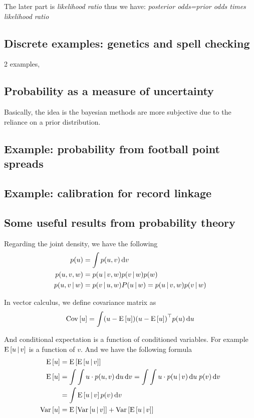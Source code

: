 \documentclass[11pt,a4paper]{article}
\begin{document}
The later part is \emph{likelihood ratio} thus we have: \emph{posterior odds=prior odds times likelihood ratio}

\subsection{Discrete examples: genetics and spell checking}

2 examples,
\subsection{Probability as a measure of uncertainty}

Basically, the idea is the bayesian methods are more subjective due to the reliance on a prior distribution.
\subsection{Example: probability from football point spreads}
\subsection{Example: calibration for record linkage}
\subsection{Some useful results from probability theory}

Regarding the joint density, we have the following
\begin{align*}
    p(u)&=\int p(u,v)\,\mathrm{d} v\\
    p(u,v,w)&=p(u\,|\, v,w)p(v\,|\, w)p(w)\\
    p(u,v\,|\, w)&=p(v\,|\, u,w)P(u\,|\, w)=p(u\,|\, v,w)p(v\,|\, w)
\end{align*}

In vector calculus, we define covariance matrix as
\[\mathrm{Cov}\left[ u \right]=\int(u-\mathrm{E}\left[ u \right]){(u-\mathrm{E}\left[ u \right])}^\top p(u)\,\mathrm{d} u\]

And conditional expectation is a function of conditioned variables. For example \(\mathrm{E}\left[ u\,|\, v \right]\) is a function of \(v\). And we have the following formula
\begin{align}
    \mathrm{E}\left[ u \right]&=\mathrm{E}\left[ \mathrm{E}\left[ u\,|\, v \right] \right]\\
    \mathrm{E}\left[ u \right]&=\int\int u\cdot p(u,v)\,\mathrm{d} u\,\mathrm{d} v=\int\int u\cdot p(u\,|\, v)\,\mathrm{d} u\; p(v)\,\mathrm{d} v\\
        &=\int \mathrm{E}\left[ u\,|\, v \right]p(v)\,\mathrm{d} v\\
    \mathrm{Var}\left[ u \right]&=\mathrm{E}\left[ \mathrm{Var}\left[ u\,|\, v \right] \right]+\mathrm{Var}\left[ \mathrm{E}\left[ u\,|\, v \right] \right]
\end{align}
\end{document}

